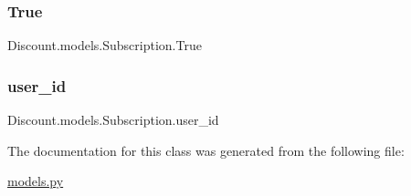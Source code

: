 \subsubsection{\texorpdfstring{True}{True}}
{\footnotesize\ttfamily Discount.\+models.\+Subscription.\+True\hspace{0.3cm}{\ttfamily [static]}}

\mbox{\label{class_discount_1_1models_1_1_subscription_acdb9b08de4ae7421070ac6e41dd73fa8}} 
\subsubsection{\texorpdfstring{user\+\_\+id}{user\_id}}
{\footnotesize\ttfamily Discount.\+models.\+Subscription.\+user\+\_\+id\hspace{0.3cm}{\ttfamily [static]}}



The documentation for this class was generated from the following file\+:\begin{DoxyCompactItemize}
\item 
\hyperlink{models_8py}{models.\+py}\end{DoxyCompactItemize}
